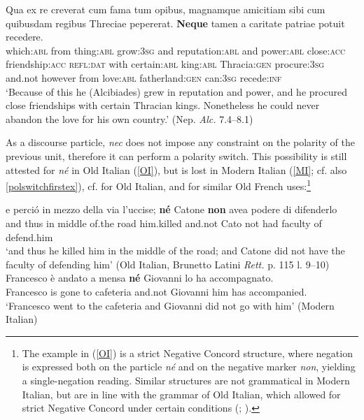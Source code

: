 \documentclass[output=paper]{langsci/langscibook}
\begin{document}
\begin{exe}
\ex \label{discoursenecparagraph} 
\gll {\normalfont\relax[7.4]} Qua ex re creverat cum fama tum opibus, magnamque amicitiam sibi cum quibusdam regibus Threciae pepererat. {\normalfont\relax[8.1]} {\textbf{Neque}} tamen a caritate patriae potuit recedere.\\
{} which:{\textsc{abl}} from thing:{\textsc{abl}} grow:{\textsc{3sg}} and reputation:{\textsc{abl}} and power:{\textsc{abl}} close:{\textsc{acc}} friendship:{\textsc{acc}} {\textsc{refl:dat}} with certain:{\textsc{abl}} king:{\textsc{abl}} Thracia:{\textsc{gen}} procure:{\textsc{3sg}} {} and.not however from love:{\textsc{abl}} fatherland:{\textsc{gen}} can:{\textsc{3sg}} recede:{\textsc{inf}}\\
\glt `Because of this he (Alcibiades) grew in reputation and power, and he procured close friendships with certain Thracian kings. Nonetheless he could never abandon the love for his own country.'
(Nep. {\emph{Alc.}} 7.4--8.1)
\end{exe}
\largerpage[-2]

\noindent As a discourse particle, {\emph{nec}} does not impose any constraint on the polarity of the previous unit, therefore it can perform a polarity switch. This possibility is still attested for {\emph{n\'e}} in Old Italian (\ref{OI}), but is lost in Modern Italian (\ref{MI}; cf. also \ref{polswitchfirstex}), cf. \citet{Zanuttini10} for Old Italian, and \citet[]{Doetjes05} for similar Old French uses:{\footnote{The example in (\ref{OI}) is a strict Negative Concord structure, where negation is expressed both on the particle {\emph{n\'e}} and on the negative marker {\emph{non}}, yielding a single-negation reading. Similar structures are not grammatical in Modern Italian, but are in line with the grammar of Old Italian, which allowed for strict Negative Concord under certain conditions (\citealt[]{Garzonio18}; \citealt[chapter 5]{Gianollo18}).}}

\begin{exe}
\ex
\begin{xlist}
\ex \label{OI} \gll e perci\'o in mezzo della via l'uccise; {\textbf{n\'e}} Catone {\textbf{non}} avea podere di difenderlo\\
and thus in middle of.the road him.killed and.not Cato not had faculty of defend.him\\
\glt `and thus he killed him in the middle of the road; and Catone did not have the faculty of defending him' (Old Italian, Brunetto Latini {\emph{Rett.}} p. 115 l. 9--10)
\ex \label{MI} \gll *Francesco \`e andato a mensa {\textbf{n\'e}} Giovanni lo ha accompagnato.\\
Francesco is gone to cafeteria and.not Giovanni him has accompanied.\\
\glt `Francesco went to the cafeteria and Giovanni did not go with him' (Modern Italian)
\end{xlist}
\end{exe}
\end{document}
